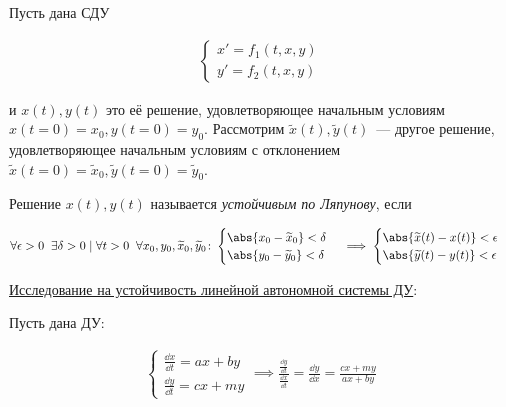 
\begin{definition}
  Пусть дана СДУ

  \begin{align*}
    \begin{cases}
      x' = f_{1}(t, x, y) \\
      y' = f_{2}(t, x, y)
    \end{cases}
  \end{align*}

  и \(x(t), y(t)\) это её решение, удовлетворяющее начальным условиям
  \(x(t = 0) = x_{0}, y(t = 0) = y_{0}\). Рассмотрим
  \(\widetilde{x}(t), \widetilde{y}(t)\)~--- другое решение, удовлетворяющее
  начальным условиям с отклонением \(
    \widetilde{x}(t = 0) = \widetilde{x}_{0},
    \widetilde{y}(t = 0) = \widetilde{y}_{0}
  \).

  Решение \(x(t), y(t)\) называется \textit{устойчивым по Ляпунову}, если

  \begin{align*}
    \forall \epsilon > 0 \;\;
    \exists \delta > 0 \mid
    \forall t > 0 \;\;
    \forall x_{0}, y_{0}, \widetilde{x}_{0}, \widetilde{y}_{0} \colon
    \begin{cases}
      \abs{x_{0} - \widetilde{x}_{0}} < \delta \\
      \abs{y_{0} - \widetilde{y}_{0}} < \delta
    \end{cases}
    \implies
    \begin{cases}
      \abs{\widetilde{x}(t) - x(t)} < \epsilon \\
      \abs{\widetilde{y}(t) - y(t)} < \epsilon
    \end{cases}
  \end{align*}
\end{definition}

\underline{Исследование на устойчивость линейной автономной системы ДУ}:

Пусть дана ДУ:

\begin{align*}\label{eq:given-sde}\tag{\(\blacklozenge\)}
  \begin{cases}
    \frac{\dd x}{\dd t} = a x + b y \\
    \frac{\dd y}{\dd t} = c x + m y
  \end{cases}
  \implies \frac{\frac{\dd y}{\dd t} }{\frac{\dd x}{\dd t}}
  = \frac{\dd y}{\dd x} 
  = \frac{c x + m y}{a x + b y} 
\end{align*}

